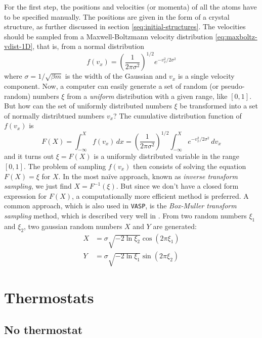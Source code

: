 \documentclass[11pt]{scrbook}   %
\newcommand{\vasp}{{\texttt{VASP}}} %
\begin{document}
For the first step, the positions and velocities (or momenta) of all the atoms have to be specified manually. 
The positions are given in the form of a crystal structure, as further discussed in section \ref{seq:initial-structures}.
The velocities should be sampled from a Maxwell-Boltzmann velocity distribution \eqref{eq:maxboltz-vdist-1D},
that is, from a normal distribution
\begin{equation}
    f(v_x) = \left(\frac{1}{2\pi\sigma^2}\right)^{1/2} e^{-v_x^2/2\sigma^2}
  \label{eq:normal-dist}
\end{equation}
where $\sigma=1/\sqrt{\beta m}$ is the width of the Gaussian and $v_x$ is a single velocity component.
Now, a computer can easily generate a set of random (or pseudo-random) numbers $\xi$ from a \emph{uniform} distribution with a given range, like $[0,1]$.
But how can the set of uniformly distributed numbers $\xi$ be transformed into a set of normally distribtued numbers $v_x$?
The cumulative distribution function of $f(v_x)$ is
\begin{equation}
    F(X) = \int_{-\infty}^X f(v_x)\,dx = \left(\frac{1}{2\pi\sigma^2}\right)^{1/2} \int_{-\infty}^X e^{-v_x^2/2\sigma^2} \,dv_x
    \label{eq:CDF}
\end{equation}
and it turns out $\xi = F(X)$ is a uniformly distributed variable in the range $[0,1]$. 
The problem of sampling $f(v_x)$ then consists of solving the equation $F(X)=\xi$ for $X$.
In the most naïve approach, known as \emph{inverse transform sampling}, we just find $X=F^{-1}(\xi)$.
But since we don't have a closed form expression for $F(X)$, a computationally more efficient method is preferred. 
A common approach, which is also used in \vasp, is the \emph{Box-Muller transform sampling} method, which is
described very well in \cite[101]{Tuckerman:2010}. 
From two random numbers $\xi_1$ and $\xi_2$, two gaussian random numbers $X$ and $Y$ are generated:
\begin{align}
    X &= \sigma \sqrt{-2\ln\xi_2} \cos(2\pi\xi_1) \\
    Y &= \sigma \sqrt{-2\ln\xi_1} \sin(2\pi\xi_2)
  \label{eq:box-muller-sampling}
\end{align}



\section{Thermostats}

\subsection{No thermostat}
\end{document}
